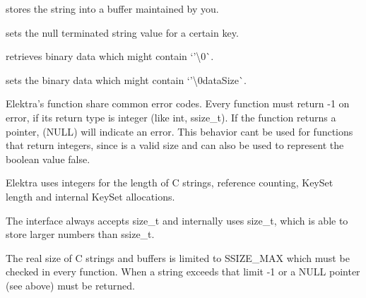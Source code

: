 stores the string into a buffer maintained by you.


\begin{DoxyCode}{0}
\end{DoxyCode}


sets the null terminated string value for a certain key.


\begin{DoxyCode}{0}
\end{DoxyCode}


retrieves binary data which might contain `'\textbackslash{}0\textquotesingle{}\`{}.


\begin{DoxyCode}{0}
\end{DoxyCode}


sets the binary data which might contain `'\textbackslash{}0data\+Size\`{}.

Elektra’s function share common error codes. Every function must return {\ttfamily -\/1} on error, if its return type is integer (like {\ttfamily int}, {\ttfamily ssize\+\_\+t}). If the function returns a pointer, {} ({\ttfamily N\+U\+LL}) will indicate an error. This behavior can\textquotesingle{}t be used for functions that return integers, since {} is a valid size and can also be used to represent the boolean value {\ttfamily false}.

Elektra uses integers for the length of C strings, reference counting, {\ttfamily Key\+Set} length and internal {\ttfamily Key\+Set} allocations.

The interface always accepts {\ttfamily size\+\_\+t} and internally uses {\ttfamily size\+\_\+t}, which is able to store larger numbers than {\ttfamily ssize\+\_\+t}.

The real size of C strings and buffers is limited to {\ttfamily S\+S\+I\+Z\+E\+\_\+\+M\+AX} which must be checked in every function. When a string exceeds that limit {\ttfamily -\/1} or a {\ttfamily N\+U\+LL} pointer (see above) must be returned.

